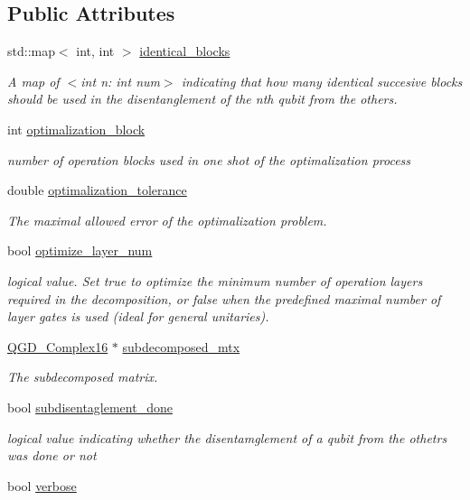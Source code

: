 \subsection*{Public Attributes}
\begin{DoxyCompactItemize}
\item 
std\+::map$<$ int, int $>$ \hyperlink{class_sub___matrix___decomposition_a9432351be5654ab8939fe7844c78bbb5}{identical\+\_\+blocks}
\begin{DoxyCompactList}\small\item\em A map of $<$int n\+: int num$>$ indicating that how many identical succesive blocks should be used in the disentanglement of the nth qubit from the others. \end{DoxyCompactList}\item 
int \hyperlink{class_decomposition___base_adae1205825aea9a9544d9ca42855b849}{optimalization\+\_\+block}
\begin{DoxyCompactList}\small\item\em number of operation blocks used in one shot of the optimalization process \end{DoxyCompactList}\item 
double \hyperlink{class_decomposition___base_ae08336b2cdfc58bbd03ba231716f28dd}{optimalization\+\_\+tolerance}
\begin{DoxyCompactList}\small\item\em The maximal allowed error of the optimalization problem. \end{DoxyCompactList}\item 
bool \hyperlink{class_sub___matrix___decomposition_a8027c13bc6b484a89b634f1fc9bba8da}{optimize\+\_\+layer\+\_\+num}
\begin{DoxyCompactList}\small\item\em logical value. Set true to optimize the minimum number of operation layers required in the decomposition, or false when the predefined maximal number of layer gates is used (ideal for general unitaries). \end{DoxyCompactList}\item 
\hyperlink{struct_q_g_d___complex16}{Q\+G\+D\+\_\+\+Complex16} $\ast$ \hyperlink{class_sub___matrix___decomposition_a6287cd71e03f5677dce69c7341aa452c}{subdecomposed\+\_\+mtx}
\begin{DoxyCompactList}\small\item\em The subdecomposed matrix. \end{DoxyCompactList}\item 
bool \hyperlink{class_sub___matrix___decomposition_a569c72bfb90a0593b45f29606ef5c068}{subdisentaglement\+\_\+done}
\begin{DoxyCompactList}\small\item\em logical value indicating whether the disentamglement of a qubit from the othetrs was done or not \end{DoxyCompactList}\item 
bool \hyperlink{class_decomposition___base_a0636a9e49a19f7167b7abdf309882042}{verbose}
\end{DoxyCompactItemize}
